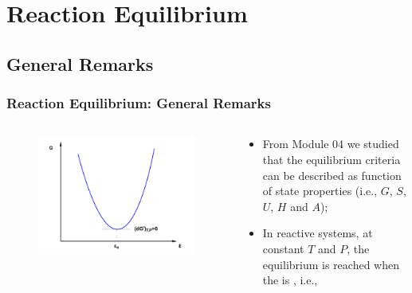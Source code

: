 \documentclass[10pt,compress,unknownkeysallowed]{beamer}
\begin{document}
\section{Reaction Equilibrium}
\subsection{General Remarks}

\begin{frame}
  \frametitle{Reaction Equilibrium: General Remarks}
  \begin{columns}
     \begin{column}[l]{0.5\linewidth}\scriptsize
      \begin{figure}%
        \begin{center}
          \includegraphics[width=1.05\columnwidth,clip]{./../Pics/ChemicalReactions_GxPlot}
        \end{center}
      \end{figure}
     \end{column}
     \begin{column}[l]{0.5\linewidth}%
        \begin{itemize} 
           \item<1-> From Module 04 we studied that the equilibrium criteria can be described as function of state properties (i.e., $G$, $S$, $U$, $H$ and $A$);
           \item<2-> In reactive systems, at constant $T$ and $P$, the equilibrium is reached when the  is , i.e., 
        \end{itemize}
     \end{column}
  \end{columns}
\end{frame}
\normalsize
\end{document}

